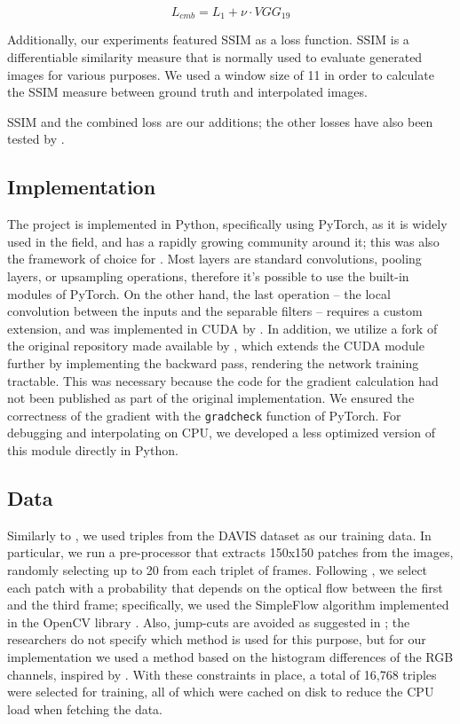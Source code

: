 \documentclass[10pt,twocolumn,letterpaper]{article}
\begin{document}
\begin{equation}
L_{cmb}= L_1 + \nu \cdot VGG_{19}
\label{eq:combined}
\end{equation}

Additionally, our experiments featured SSIM as a loss function. SSIM is a differentiable similarity measure that is normally used to evaluate generated images for various purposes. We used a window size of 11 in order to calculate the SSIM measure between ground truth and interpolated images.

SSIM and the combined loss are our additions; the other losses have also been tested by \citeauthor{SepConv}.


\subsection{Implementation}
The project is implemented in Python, specifically using PyTorch, as it is widely used in the field, and has a rapidly growing community around it; this was also the framework of choice for \citeauthor{SepConv}. Most layers are standard convolutions, pooling layers, or upsampling operations, therefore it's possible to use the built-in modules of PyTorch. On the other hand, the last operation -- the local convolution between the inputs and the separable filters -- requires a custom extension, and was implemented in CUDA by \citeauthor{SepConv}. In addition, we utilize a fork of the original repository made available by \citeauthor{GibbonsFork}, which extends the CUDA module further by implementing the backward pass, rendering the network training tractable. This was necessary because the code for the gradient calculation had not been published as part of the original implementation. We ensured the correctness of the gradient with the \texttt{gradcheck} function of PyTorch. For debugging and interpolating on CPU, we developed a less optimized version of this module directly in Python.


\subsection{Data}
\label{sec:data}
Similarly to \citeauthor{PhaseNet}, we used triples from the DAVIS dataset \cite{Davis16, Davis17} as our training data. In particular, we run a pre-processor that extracts 150x150 patches from the images, randomly selecting up to 20 from each triplet of frames. Following \cite{SepConv}, we select each patch with a probability that depends on the optical flow between the first and the third frame; specifically, we used the SimpleFlow algorithm implemented in the OpenCV library \cite{OpenCV}. Also, jump-cuts are avoided as suggested in \cite{SepConv}; the researchers do not specify which method is used for this purpose, but for our implementation we used a method based on the histogram differences of the RGB channels, inspired by \citeauthor{Priya10}. With these constraints in place, a total of 16,768 triples were selected for training, all of which were cached on disk to reduce the CPU load when fetching the data.
\end{document}
